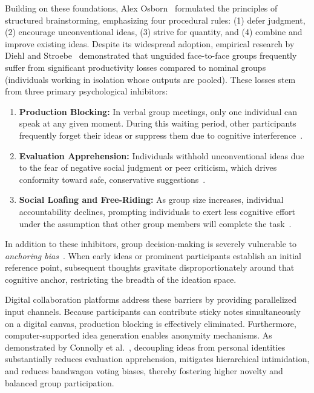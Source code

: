 Building on these foundations, Alex Osborn~\cite{osborn1953applied} formulated the principles of structured brainstorming, emphasizing four procedural rules: (1) defer judgment, (2) encourage unconventional ideas, (3) strive for quantity, and (4) combine and improve existing ideas. Despite its widespread adoption, empirical research by Diehl and Stroebe~\cite{diehl1987productivity} demonstrated that unguided face-to-face groups frequently suffer from significant productivity losses compared to nominal groups (individuals working in isolation whose outputs are pooled). These losses stem from three primary psychological inhibitors:
\begin{enumerate}
    \item \textbf{Production Blocking:} In verbal group meetings, only one individual can speak at any given moment. During this waiting period, other participants frequently forget their ideas or suppress them due to cognitive interference~\cite{diehl1987productivity}.
    \item \textbf{Evaluation Apprehension:} Individuals withhold unconventional ideas due to the fear of negative social judgment or peer criticism, which drives conformity toward safe, conservative suggestions~\cite{mullen1991productivity}.
    \item \textbf{Social Loafing and Free-Riding:} As group size increases, individual accountability declines, prompting individuals to exert less cognitive effort under the assumption that other group members will complete the task~\cite{karau1993social}.
\end{enumerate}

In addition to these inhibitors, group decision-making is severely vulnerable to \textit{anchoring bias}~\cite{tversky1974judgment}. When early ideas or prominent participants establish an initial reference point, subsequent thoughts gravitate disproportionately around that cognitive anchor, restricting the breadth of the ideation space.

Digital collaboration platforms address these barriers by providing parallelized input channels. Because participants can contribute sticky notes simultaneously on a digital canvas, production blocking is effectively eliminated. Furthermore, computer-supported idea generation enables anonymity mechanisms. As demonstrated by Connolly et al.~\cite{connolly1990idea}, decoupling ideas from personal identities substantially reduces evaluation apprehension, mitigates hierarchical intimidation, and reduces bandwagon voting biases, thereby fostering higher novelty and balanced group participation.

